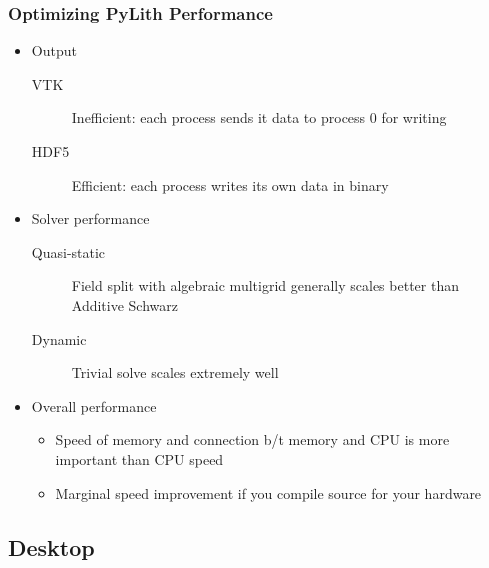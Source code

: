 \documentclass{beamer}
\begin{document}
\begin{frame}
  \frametitle{Optimizing PyLith Performance}

  \begin{itemize}
  \item Output
    \begin{description}
    \item[VTK] Inefficient: each process sends it data to process 0
      for writing
    \item[HDF5] Efficient: each process writes its own data in binary
    \end{description}
  \item Solver performance
    \begin{description}
    \item[Quasi-static] Field split with algebraic multigrid generally
      scales better than Additive Schwarz
    \item[Dynamic] Trivial solve scales extremely well
    \end{description}
  \item Overall performance
    \begin{itemize}
    \item Speed of memory and connection b/t memory and CPU is more
      important than CPU speed
    \item Marginal speed improvement if you compile source for your hardware
    \end{itemize}
  \end{itemize}

\end{frame}


\subsection{Desktop}
\end{document}
